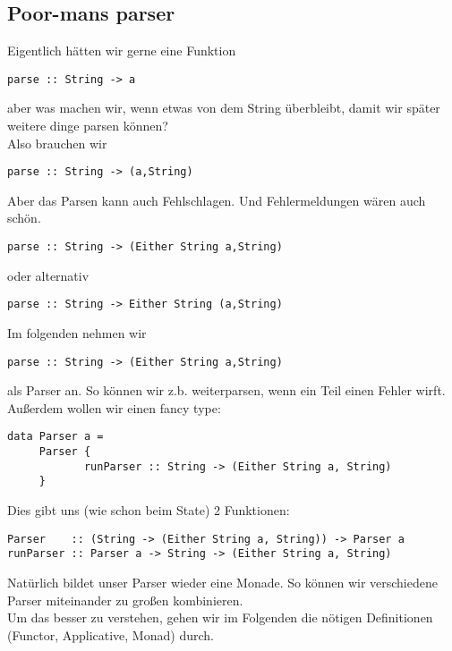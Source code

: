 \documentclass{beamer}
\begin{document}
\subsection{Poor-mans parser}
\begin{frame}[fragile]
Eigentlich hätten wir gerne eine Funktion
\begin{verbatim}
parse :: String -> a
\end{verbatim}
\pause
aber was machen wir, wenn etwas von dem String überbleibt, damit wir später weitere dinge parsen können?\\
\pause
Also brauchen wir
\begin{verbatim}
parse :: String -> (a,String)
\end{verbatim}
\pause
Aber das Parsen kann auch Fehlschlagen. Und Fehlermeldungen wären auch schön.
\pause
\begin{verbatim}
parse :: String -> (Either String a,String)
\end{verbatim}
oder alternativ
\begin{verbatim}
parse :: String -> Either String (a,String)
\end{verbatim}
\end{frame}

\begin{frame}[fragile]
Im folgenden nehmen wir
\begin{verbatim}
parse :: String -> (Either String a,String)
\end{verbatim}
als Parser an. So können wir z.b. weiterparsen, wenn ein Teil einen Fehler wirft. Außerdem wollen wir einen fancy type:
\begin{verbatim}
data Parser a = 
     Parser {
            runParser :: String -> (Either String a, String)
     }
\end{verbatim}
\pause
Dies gibt uns (wie schon beim State) 2 Funktionen:
\begin{verbatim}
Parser    :: (String -> (Either String a, String)) -> Parser a
runParser :: Parser a -> String -> (Either String a, String)
\end{verbatim}
\end{frame}

\begin{frame}[fragile]
Natürlich bildet unser Parser wieder eine Monade. So können wir verschiedene Parser miteinander zu großen kombinieren.\\
Um das besser zu verstehen, gehen wir im Folgenden die nötigen Definitionen (Functor, Applicative, Monad) durch.
\end{frame}
\end{document}
